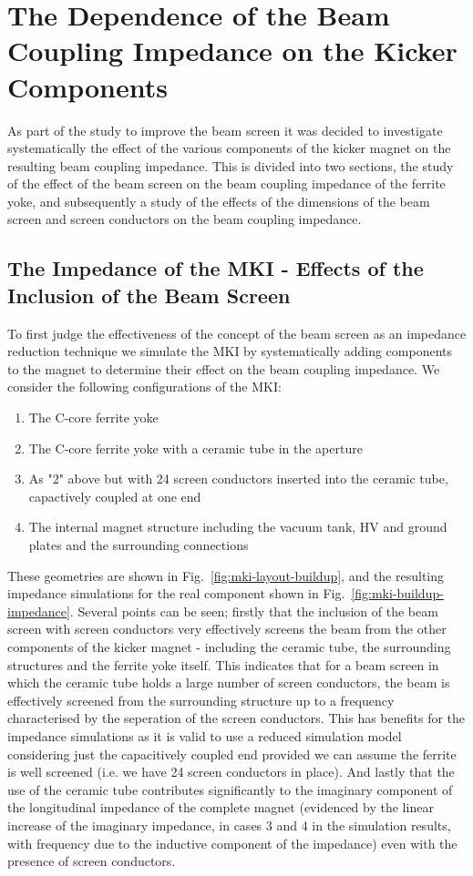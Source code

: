\section{The Dependence of the Beam Coupling Impedance on the Kicker Components}

As part of the study to improve the beam screen it was decided to investigate systematically the effect of the various components of the kicker magnet on the resulting beam coupling impedance. This is divided into two sections, the study of the effect of the beam screen on the beam coupling impedance of the ferrite yoke, and subsequently a study of the effects of the dimensions of the beam screen and screen conductors on the beam coupling impedance.

\subsection{The Impedance of the MKI - Effects of the Inclusion of the Beam Screen}

To first judge the effectiveness of the concept of the beam screen as an impedance reduction technique we simulate the MKI by systematically adding components to the magnet to determine their effect on the beam coupling impedance. We consider the following configurations of the MKI:

\begin{enumerate}
\item{The C-core ferrite yoke}
\item{The C-core ferrite yoke with a ceramic tube in the aperture}
\item{As "2" above but with 24 screen conductors inserted into the ceramic tube, capactively coupled at one end}
\item{The internal magnet structure including the vacuum tank, HV and ground plates and the surrounding connections}
\end{enumerate}

These geometries are shown in Fig.~\ref{fig:mki-layout-buildup}, and the resulting impedance simulations for the real component shown in Fig.~\ref{fig:mki-buildup-impedance}. Several points can be seen; firstly that the inclusion of the beam screen with screen conductors very effectively screens the beam from the other components of the kicker magnet - including the ceramic tube, the surrounding structures and the ferrite yoke itself. This indicates that for a beam screen in which the ceramic tube holds a large number of screen conductors, the beam is effectively screened from the surrounding structure up to a frequency characterised by the seperation of the screen conductors. This has benefits for the impedance simulations as it is valid to use a reduced simulation model considering just the capacitively coupled end provided we can assume the ferrite is well screened (i.e. we have 24 screen conductors in place). And lastly that the use of the ceramic tube contributes significantly to the imaginary component of the longitudinal impedance of the complete magnet (evidenced by the linear increase of the imaginary impedance, in cases 3 and 4 in the simulation results, with frequency due to the inductive component of the impedance) even with the presence of screen conductors.
 
